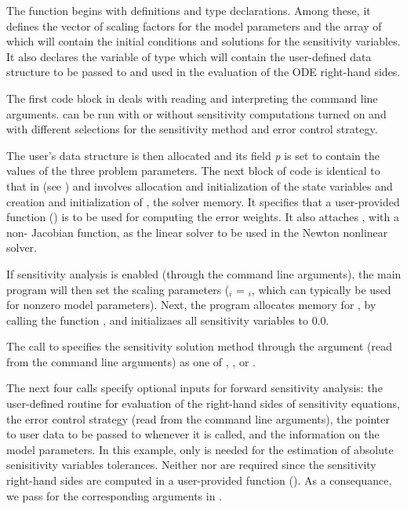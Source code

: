 The  function begins with definitions and type declarations. 
Among these, it defines the vector  of  scaling factors for
the model parameters   and the array  of 
 which will contain the initial conditions and solutions for the sensitivity
variables. It also declares the variable  of type  
which will contain the user-defined data structure to be passed to {\cvodes} and used in the 
evaluation of the ODE right-hand sides.

The first code block in  deals with reading and interpreting the
command line arguments.  can be run with or without sensitivity computations
turned on and with different selections for the sensitivity method and error control strategy.

The user's data structure is then allocated and its field {\em p} is set to contain
the values of the three problem parameters.
The next block of code is identical to that in  (see \cite{cvode2.4.0_ex})
and involves allocation and initialization of the state variables and creation and 
initialization of , the {\cvodes} solver memory. It specifies that
a user-provided function () is to be used for computing the error weights.
It also attaches {\cvdense}, with a non- Jacobian function, as the linear solver 
to be used in the Newton nonlinear solver.

If sensitivity analysis is enabled (through the command line arguments), 
the main program will then set the scaling parameters
 ($_i$ = $_i$, which can typically be used for 
nonzero model parameters). 
Next, the program allocates memory for , by calling the {\nvecs} function 
, and initializaes all sensitivity variables to $0.0$.

The call to  specifies the sensitivity solution
method through the argument  (read from the command
line arguments) as one of , , or
.

The next four calls specify optional inputs for forward sensitivity analysis:
the user-defined routine for evaluation of the right-hand
sides of sensitivity equations, the error control strategy
(read from the command line arguments), the pointer to
user data to be passed to  whenever it is called, and  
the information on the model parameters. In this example, only  is needed for the 
estimation of absolute senisitivity variables tolerances. Neither  nor 
are required since the sensitivity right-hand sides are computed in a user-provided
function (). As a consequance, we pass  for the corresponding arguments in
.

